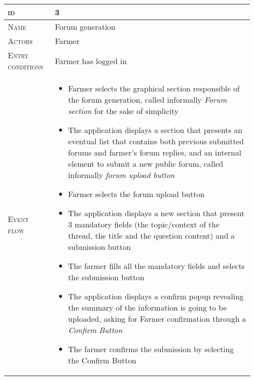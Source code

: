 \begin{table}[H]
    \centering
    \begin{tabular}{|l|p{}|}
        \hline %
    	\textsc{id}                 &   3\\
    	\hline %
    	\textsc{Name}               &   Forum generation\\
    	\hline %
    	\textsc{Actors}             &   Farmer\\
    	\hline %
    	\textsc{Entry conditions}   &   Farmer has logged in\\
    	\hline %
    	\textsc{Event flow}         &   \footnotesize
            	                        \begin{itemize}
                                    	    \item Farmer selects the graphical section responsible of the forum generation, called informally \textit{Forum section} for the sake of simplicity
                                    		\item The application displays a section that presents an eventual list that contains both previous submitted forums and farmer's forum replies, and an internal element to submit a new public forum, called informally \textit{forum upload button}
                                    		\item Farmer selects the forum upload button
                                    		\item The application displays a new section that present 3 mandatory fields (the topic/context of the thread, the title and the question content) and a submission button
                                    		\item The farmer fills all the mandatory fields and selects the submission button
                                    		\item The application displays a confirm popup revealing the summary of the information is going to be uploaded, asking for Farmer confirmation through a \textit{Confirm Button}
                                    		\item The farmer confirms the submission by selecting the Confirm Button
                                        \end{itemize}\\

\end{tabular}
\end{table}
